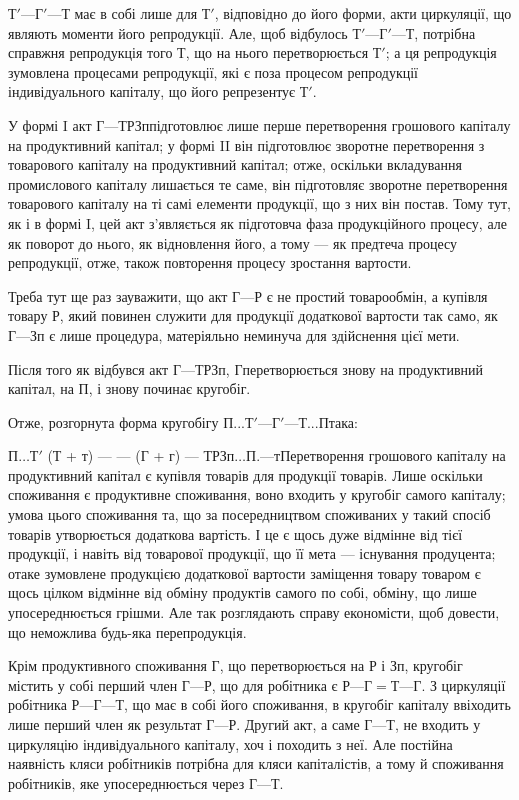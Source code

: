 $Т' — Г' — Т$ має в собі лише для $Т'$, відповідно до його форми,
акти циркуляції, що являють моменти його репродукції. Але, щоб відбулось
$Т' — Г' — Т$, потрібна справжня репродукція того Т, що на нього
перетворюється $Т'$; а ця репродукція зумовлена процесами репродукції,
які є поза процесом репродукції індивідуального капіталу, що його
репрезентує $Т'$.

У формі I акт $Г — Т Р Зп п$ідготовлює лише перше перетворення
грошового капіталу на продуктивний капітал; у формі II він підготовлює
зворотне перетворення з товарового капіталу на продуктивний капітал;
отже, оскільки вкладування промислового капіталу лишається те саме,
він підготовляє зворотне перетворення товарового капіталу на ті самі
елементи продукції, що з них він постав. Тому тут, як і в формі I, цей
акт з’являється як підготовча фаза продукційного процесу, але як
поворот до нього, як відновлення його, а тому — як предтеча процесу
репродукції, отже, також повторення процесу зростання вартости.

Треба тут ще раз зауважити, що акт $Г — Р$ є не простий товарообмін,
а купівля товару Р, який повинен служити для продукції додаткової
вартости так само, як $Г — Зп$ є лише процедура, матеріяльно неминуча
для здійснення цієї мети.

Після того як відбувся акт $Г — Т Р Зп$, $Г п$еретворюється знову
на продуктивний капітал, на П, і знову починає кругобіг.

Отже, розгорнута форма кругобігу $П... Т' — Г' — Т... П т$ака:

$П … Т'$ (Т + т) — — (Г + г) — $Т Р Зп … П. — т

П$еретворення грошового капіталу на продуктивний капітал є купівля
товарів для продукції товарів. Лише оскільки споживання є продуктивне
споживання, воно входить у кругобіг самого капіталу; умова цього споживання
та, що за посередництвом споживаних у такий спосіб товарів утворюється
додаткова вартість. І це є щось дуже відмінне від тієї продукції,
і навіть від товарової продукції, що її мета — існування продуцента;
отаке зумовлене продукцією додаткової вартости заміщення товару
товаром є щось цілком відмінне від обміну продуктів самого по собі,
обміну, що лише упосереднюється грішми. Але так розглядають справу
економісти, щоб довести, що неможлива будь-яка перепродукція.

Крім продуктивного споживання Г, що перетворюється на Р і Зп,
кругобіг містить у собі перший член $Г — Р$, що для робітника є $Р — Г =
Т — Г$. З циркуляції робітника $Р — Г — Т$, що має в собі його споживання,
в кругобіг капіталу ввіходить лише перший член як результат
$Г — Р$. Другий акт, а саме $Г — Т$, не входить у циркуляцію індивідуального
капіталу, хоч і походить з неї. Але постійна наявність кляси
робітників потрібна для кляси капіталістів, а тому й споживання робітників,
яке упосереднюється через $Г — Т$.

